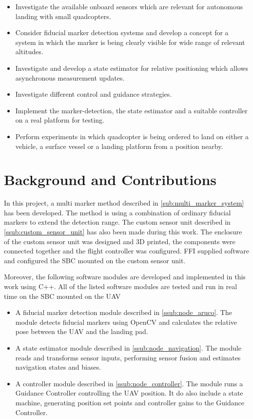 \begin{itemize}
	\item Investigate the available onboard sensors which are relevant for autonomous landing with small quadcopters.
	\item Consider fiducial marker detection systems and develop a concept for a system in which the marker is being clearly visible for wide range of relevant altitudes.
	\item Investigate and develop a state estimator for relative positioning which allows asynchronous measurement updates.
	\item Investigate different control and guidance strategies.
	\item Implement the marker-detection, the state estimator and a suitable controller on a real platform for testing.
	\item Perform experiments in which quadcopter is being ordered to land on either a vehicle, a surface vessel or a landing platform from a position nearby.
\end{itemize}


\section{Background and Contributions} %
\label{sec:background_and_contributions}

In this project, a multi marker method described in \ref{sub:multi_marker_system} has been developed. The method is using a combination of ordinary fiducial markers to extend the detection range. The custom sensor unit described in \ref{ssub:custom_sensor_unit} has also been made during this work. The enclosure of the custom sensor unit was designed and 3D printed, the components were connected together and the flight controller was configured. FFI supplied software and configured the \gls{SBC} mounted on the custom sensor unit.

Moreover, the following software modules are developed and implemented in this work using C++. All of the listed software modules are tested and run in real time on the \gls{SBC} mounted on the \gls{UAV}
\begin{itemize}
	\item A fiducial marker detection module described in \ref{ssub:node_aruco}. The module detects fiducial markers using \gls{OpenCV} and calculates the relative pose between the \gls{UAV} and the landing pad.
	\item A state estimator module described in \ref{ssub:node_navigation}. The module reads and transforms sensor inputs, performing sensor fusion and estimates navigation states and biases.
	\item A controller module described in \ref{ssub:node_controller}. The module runs a Guidance Controller controlling the \gls{UAV} position. It do also include a state machine, generating position set points and controller gains to the Guidance Controller.
\end{itemize}

